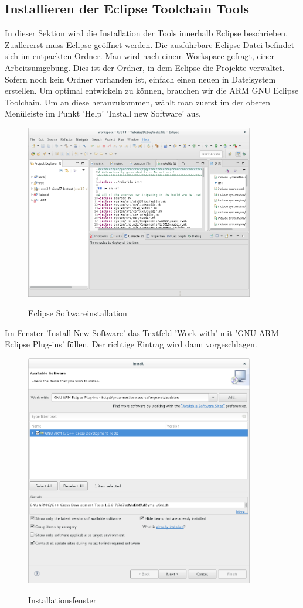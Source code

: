 \documentclass[12pt,a4paper]{article}
\begin{document}
\subsection{Installieren der Eclipse Toolchain Tools}
In dieser Sektion wird die Installation der Tools innerhalb Eclipse beschrieben.
Zuallererst muss Eclipse geöffnet werden. Die ausführbare Eclipse-Datei befindet sich im entpackten Ordner.
Man wird nach einem Workspace gefragt, einer Arbeitsumgebung. Dies ist der Ordner, in dem Eclipse die Projekte verwaltet. Sofern noch kein Ordner vorhanden ist, einfach einen neuen in Dateisystem erstellen.
Um optimal entwickeln zu können, brauchen wir die ARM GNU Eclipse Toolchain. Um an diese heranzukommen, wählt man zuerst im der oberen Menüleiste im Punkt 'Help' 'Install new Software' aus.
\begin{figure}[h]
\begin{center}
\includegraphics[width=10cm]{grafiken/debugger/EclipseNewSoftware.png}
\label{eclipse_softwareinstallation}
\caption{Eclipse Softwareinstallation}
\end{center}
\end{figure}
Im Fenster 'Install New Software' das Textfeld 'Work with' mit 'GNU ARM Eclipse Plug-ins' füllen. Der richtige Eintrag wird dann vorgeschlagen.
\begin{figure}[h]
\begin{center}
\includegraphics[width=10cm]{grafiken/debugger/GNUauswahl.png}
\label{eclipse_gnu_auswahl}
\caption{Installationsfenster}
\end{center}
\end{figure}
\end{document}
